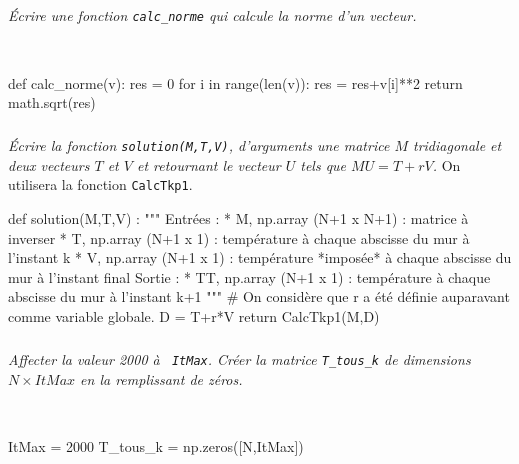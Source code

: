 \documentclass[10pt,fleqn]{article} %
\begin{document}
\begin{multicols}{2}
\begin{multicols}{2}
\fi

\subparagraph{}
\textit{Écrire une fonction \texttt{calc\_norme} qui calcule la norme d'un vecteur. }
\ifprof
\begin{corrige}
 ~\\
\begin{python}
def calc_norme(v):
    res = 0
    for i in range(len(v)):
        res = res+v[i]**2
    return math.sqrt(res)        
\end{python}
\end{corrige}
\else
\fi

\subparagraph{\label{q_solve}}
\textit{Écrire la fonction \texttt{solution(M,T,V)}, d'arguments une matrice $M$
 tridiagonale et deux vecteurs $T$ et $V$ et retournant le vecteur $U$ tels que $MU=T+rV$.}
 On utilisera la fonction \texttt{CalcTkp1}.
\ifprof   
\begin{corrige}
\begin{python}
def solution(M,T,V) :
    """
    Entrées : 
        * M, np.array (N+1 x N+1) : matrice à inverser
        * T, np.array (N+1 x 1) : température à chaque abscisse du mur à l'instant k
        * V, np.array (N+1 x 1) : température *imposée* à chaque abscisse du mur à l'instant final
    Sortie : 
        * TT, np.array (N+1 x 1) : température à chaque abscisse du mur à l'instant k+1
    """
    # On considère que r a été définie auparavant comme variable globale.
    D = T+r*V
    return CalcTkp1(M,D)
\end{python}
\end{corrige}
\else
\fi

\subparagraph{}
\textit{Affecter la valeur 2000 à  \texttt{ ItMax}. Créer la matrice  \texttt{T\_tous\_k}  de dimensions $N\times ItMax$ en la remplissant de zéros.}
\ifprof
\begin{corrige}
~\\
\begin{python}
ItMax = 2000
T_tous_k = np.zeros([N,ItMax])
\end{python}
\end{corrige}
\else
\fi



\end{multicols}
\end{multicols}
\end{document}

